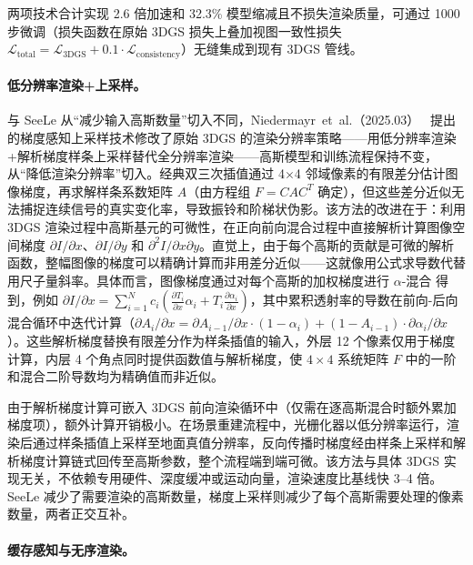 两项技术合计实现 2.6 倍加速和 32.3\% 模型缩减且不损失渲染质量，可通过 1000 步微调（损失函数在原始 3DGS 损失上叠加视图一致性损失 $\mathcal{L}_\text{total} = \mathcal{L}_\text{3DGS} + 0.1 \cdot \mathcal{L}_\text{consistency}$）无缝集成到现有 3DGS 管线。

\paragraph{低分辨率渲染+上采样。}

与 SeeLe 从“减少输入高斯数量”切入不同，Niedermayr~et~al.（2025.03）~\cite{2503_14171} 提出的梯度感知上采样技术修改了原始 3DGS 的渲染分辨率策略——用低分辨率渲染+解析梯度样条上采样替代全分辨率渲染——高斯模型和训练流程保持不变，从“降低渲染分辨率”切入。经典双三次插值通过 4$\times$4 邻域像素的有限差分估计图像梯度，再求解样条系数矩阵 $A$（由方程组 $F = CAC^T$ 确定），但这些差分近似无法捕捉连续信号的真实变化率，导致振铃和阶梯状伪影。该方法的改进在于：利用 3DGS 渲染过程中高斯基元的可微性，在正向前向混合过程中直接解析计算图像空间梯度 $\partial I / \partial x$、$\partial I / \partial y$ 和 $\partial^2 I / \partial x \partial y$。直觉上，由于每个高斯的贡献是可微的解析函数，整幅图像的梯度可以精确计算而非用差分近似——这就像用公式求导数代替用尺子量斜率。具体而言，图像梯度通过对每个高斯的加权梯度进行 $\alpha$-混合 得到，例如 $\partial I / \partial x = \sum_{i=1}^N c_i \left( \frac{\partial T_i}{\partial x} \alpha_i + T_i \frac{\partial \alpha_i}{\partial x} \right)$，其中累积透射率的导数在前向-后向混合循环中迭代计算（$\partial A_i / \partial x = \partial A_{i-1} / \partial x \cdot (1-\alpha_i) + (1-A_{i-1}) \cdot \partial\alpha_i / \partial x$）。这些解析梯度替换有限差分作为样条插值的输入，外层 12 个像素仅用于梯度计算，内层 4 个角点同时提供函数值与解析梯度，使 $4\times4$ 系统矩阵 $F$ 中的一阶和混合二阶导数均为精确值而非近似。

由于解析梯度计算可嵌入 3DGS 前向渲染循环中（仅需在逐高斯混合时额外累加梯度项），额外计算开销极小。在场景重建流程中，光栅化器以低分辨率运行，渲染后通过样条插值上采样至地面真值分辨率，反向传播时梯度经由样条上采样和解析梯度计算链式回传至高斯参数，整个流程端到端可微。该方法与具体 3DGS 实现无关，不依赖专用硬件、深度缓冲或运动向量，渲染速度比基线快 3--4 倍。SeeLe 减少了需要渲染的高斯数量，梯度上采样则减少了每个高斯需要处理的像素数量，两者正交互补。

\paragraph{缓存感知与无序渲染。}

